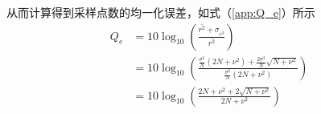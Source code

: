 从而计算得到采样点数的均一化误差，如式（\ref{app:Q_e}）所示
\begin{equation}
\begin{split}
    Q_e&=10 \log_{10}\left(\frac{\bar{r^2}+\sigma_{\bar{r^2}}}{\bar{r^2}}\right)\\
    &=10 \log_{10}\left(\frac{\frac{\sigma^2}{N}\left(2N+\nu^2\right)+\frac{2\sigma^2}{N}\sqrt{N+\nu^2}}{\frac{\sigma^2}{N}(2N+\nu^2)}\right)\\
    &=10 \log_{10}\left(\frac{2N+\nu^2+2\sqrt{N+\nu^2}}{2N+\nu^2}\right)
\end{split}
\label{app:Q_e}
\end{equation}

